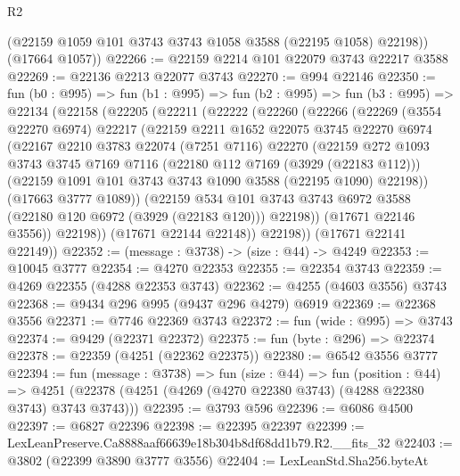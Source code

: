 \begin{lexlean}{R2}
\begin{coremodule}
        (@22159 @1059 @101 @3743 @3743 @1058 @3588 (@22195 @1058) @22198))
      (@17664 @1057))
@22266 := @22159 @2214 @101 @22079 @3743 @22217 @3588
@22269 := @22136 @2213 @22077 @3743
@22270 := @994 @22146
@22350 := fun (b0 : @995) =>
  fun (b1 : @995) =>
  fun (b2 : @995) =>
  fun (b3 : @995) =>
  @22134
    (@22158
      (@22205
        (@22211
          (@22222
            (@22260
              (@22266
                (@22269
                  (@3554 @22270 @6974)
                  @22217
                  (@22159
                    @2211
                    @1652
                    @22075
                    @3745
                    @22270
                    @6974
                    (@22167
                      @2210
                      @3783
                      @22074
                      (@7251 @7116)
                      @22270
                      (@22159
                        @272
                        @1093
                        @3743
                        @3745
                        @7169
                        @7116
                        (@22180 @112 @7169 (@3929 (@22183 @112)))
                        (@22159 @1091 @101 @3743 @3743 @1090 @3588 (@22195 @1090) @22198))
                      (@17663 @3777 @1089))
                    (@22159
                      @534
                      @101
                      @3743
                      @3743
                      @6972
                      @3588
                      (@22180 @120 @6972 (@3929 (@22183 @120)))
                      @22198))
                  (@17671 @22146 @3556))
                @22198))
            (@17671 @22144 @22148))
          @22198))
      (@17671 @22141 @22149))
@22352 := (message : @3738) -> (size : @44) -> @4249
@22353 := @10045 @3777
@22354 := @4270 @22353
@22355 := @22354 @3743
@22359 := @4269 @22355 (@4288 @22353 @3743)
@22362 := @4255 (@4603 @3556) @3743
@22368 := @9434 @296 @995 (@9437 @296 @4279) @6919
@22369 := @22368 @3556
@22371 := @7746 @22369 @3743
@22372 := fun (wide : @995) => @3743
@22374 := @9429 (@22371 @22372)
@22375 := fun (byte : @296) => @22374
@22378 := @22359 (@4251 (@22362 @22375))
@22380 := @6542 @3556 @3777
@22394 := fun (message : @3738) =>
  fun (size : @44) =>
  fun (position : @44) =>
  @4251 (@22378 (@4251 (@4269 (@4270 @22380 @3743) (@4288 @22380 @3743) @3743 @3743)))
@22395 := @3793 @596
@22396 := @6086 @4500
@22397 := @6827 @22396
@22398 := @22395 @22397
@22399 := LexLeanPreserve.Ca8888aaf66639e18b304b8df68dd1b79.R2.__fits_32
@22403 := @3802 (@22399 @3890 @3777 @3556)
@22404 := LexLeanStd.Sha256.byteAt

\end{coremodule}
\end{lexlean}
